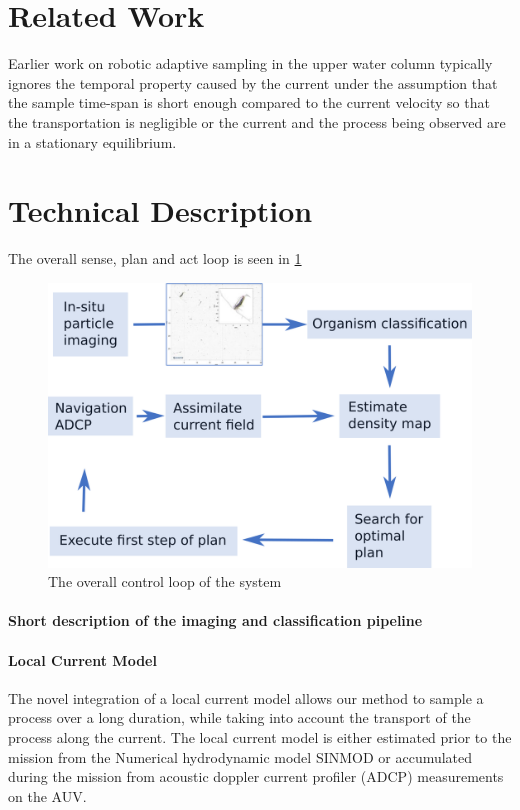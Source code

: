 \documentclass[conference]{IEEEtran}
\begin{document}
\section{Related Work}
Earlier work on robotic adaptive sampling in the upper water column typically ignores the temporal property caused by the current under the assumption that the sample time-span is short enough compared to the current velocity so that the transportation is negligible or the current and the process being observed are in a stationary equilibrium.

\section{Technical Description}
The overall sense, plan and act loop is seen in \cref{fig:sensePlanActLoop}
\begin{figure}[tbp]
\centerline{\includegraphics[width=\linewidth]{figures/workflow-simplified.png}}
\caption{The overall control loop of the system}
\label{fig:sensePlanActLoop}
\end{figure}

\paragraph{Short description of the imaging and classification pipeline}

\paragraph{Local Current Model}
The novel integration of a local current model allows our method to sample a process over a long duration, while taking into account the transport of the process along the current.
The local current model is either estimated prior to the mission from the Numerical hydrodynamic model SINMOD or accumulated during the mission from acoustic doppler current profiler (ADCP) measurements on the AUV.
\end{document}
